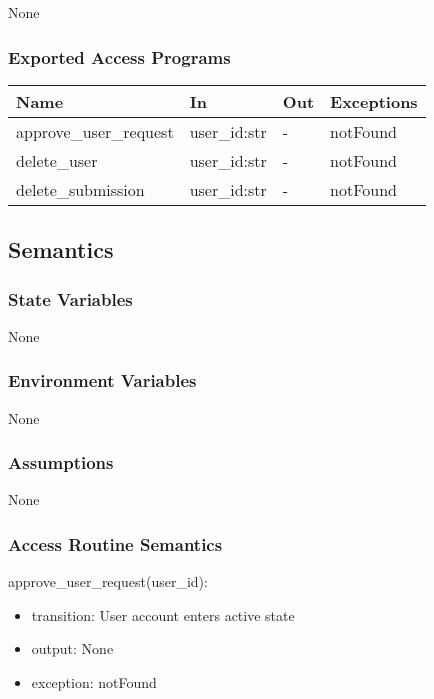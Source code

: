 \documentclass[12pt, titlepage]{article}
\begin{document}
None

\subsubsection{Exported Access Programs}

\begin{center}
\begin{tabular}{p{4cm} p{4cm} p{4cm} p{2cm}}
\hline
\textbf{Name} & \textbf{In} & \textbf{Out} & \textbf{Exceptions} \\
\hline
approve\_user\_request & user\_id:str & - & notFound \\
delete\_user & user\_id:str & - & notFound \\
delete\_submission & user\_id:str & - & notFound \\
\hline
\end{tabular}
\end{center}

\subsection{Semantics}

\subsubsection{State Variables}

None

\subsubsection{Environment Variables}

None

\subsubsection{Assumptions}

None

\subsubsection{Access Routine Semantics}

\noindent approve\_user\_request(user\_id):
\begin{itemize}
\item transition: User account enters active state
\item output: None
\item exception: notFound
\end{itemize}
\end{document}
